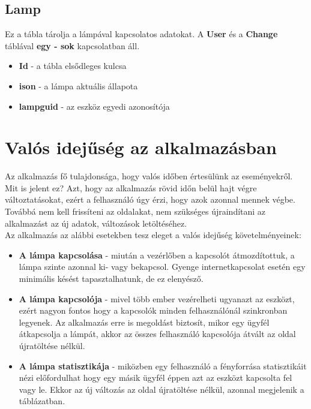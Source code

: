 \documentclass[a4paper,12pt]{report}
\begin{document}
    \subsection{Lamp}
    Ez a tábla tárolja a lámpával kapcsolatos adatokat. A \textbf{User} és a \textbf{Change} táblával \textbf{egy - sok} kapcsolatban
    áll.

    \begin{itemize}
        \item \textbf{Id} - a tábla elsődleges kulcsa
        \item \textbf{ison} - a lámpa aktuális állapota
        \item \textbf{lampguid} - az eszköz egyedi azonosítója
    \end{itemize}

    \section{Valós idejűség az alkalmazásban}
    Az alkalmazás fő tulajdonsága, hogy valós időben értesülünk az eseményekről. Mit is jelent ez? Azt, hogy az alkalmazás
    rövid időn belül hajt végre változtatásokat, ezért a felhasználó úgy érzi, hogy azok azonnal mennek végbe. Továbbá
    nem kell frissíteni az oldalakat, nem szükséges újraindítani az alkalmazást az új adatok, változások letöltéséhez.\\

    Az alkalmazás az alábbi esetekben tesz eleget a valós idejűség követelményeinek:

    \begin{itemize}
        \item \textbf{A lámpa kapcsolása} - miután a vezérlőben a kapcsolót átmozdítottuk, a lámpa szinte azonnal ki- vagy bekapcsol.
        Gyenge internetkapcsolat esetén egy minimális késést tapasztalhatunk, de ez elenyésző.
        \item \textbf{A lámpa kapcsolója} - mivel több ember vezérelheti ugyanazt az eszközt, ezért nagyon fontos hogy a kapcsolók
        minden felhasználónál szinkronban legyenek. Az alkalmazás erre is megoldást biztosít, mikor egy ügyfél átkapcsolja a lámpát,
        akkor az összes felhasználó kapcsolója átvált az oldal újratöltése nélkül.
        \item \textbf{A lámpa statisztikája} - miközben egy felhasználó a fényforrása statisztikáit nézi előfordulhat hogy egy másik
        ügyfél éppen azt az eszközt kapcsolta fel vagy le. Ekkor az új változás az oldal újratöltése nélkül, azonnal megjelenik a táblázatban.
    \end{itemize}
\end{document}
